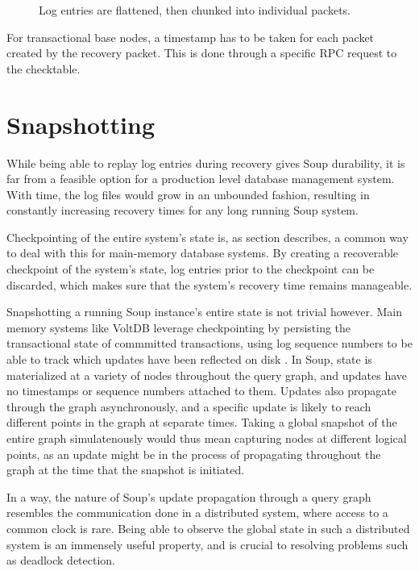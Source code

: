 \documentclass[b5paper]{report}
\begin{document}
\begin{figure}[H]
  
  \caption{
    Log entries are flattened, then chunked into individual packets.
    \label{log-chunking}
  }
\end{figure}

For transactional base nodes, a timestamp has to be taken for each packet
created by the recovery packet. This is done through a specific RPC request to the
checktable.

\section{Snapshotting}
While being able to replay log entries during recovery
gives Soup durability, it is far from a feasible option for a production level
database management system. With time, the log files would grow in an unbounded
fashion, resulting in constantly increasing recovery times for any long running
Soup system.

Checkpointing of the entire system's state is, as section
\label{main-memory-recovery} describes, a common way to deal with this for
main-memory database systems. By creating a recoverable checkpoint of the
system's state, log entries prior to the checkpoint can be discarded, which
makes sure that the system's recovery time remains manageable.

Snapshotting a running Soup instance's entire state is not trivial however.
Main memory systems like VoltDB leverage checkpointing by persisting the
transactional state of commmitted transactions, using log sequence numbers to be
able to track which updates have been reflected on disk \cite{voltdb-recovery}.
In Soup, state is materialized at a variety of nodes throughout the query graph,
and updates have no timestamps or sequence numbers attached to them. Updates
also propagate through the graph asynchronously, and a specific update is likely
to reach different points in the graph at separate times. Taking a global
snapshot of the entire graph simulatenously would thus mean capturing nodes at
different logical points, as an update might be in the process of propagating
throughout the graph at the time that the snapshot is initiated.

In a way, the nature of Soup's update propagation through a query graph
resembles the communication done in a distributed system, where access to a
common clock is rare. Being able to observe the global state in such a
distributed system is an immensely useful property, and is crucial to resolving
problems such as deadlock detection.
\end{document}
